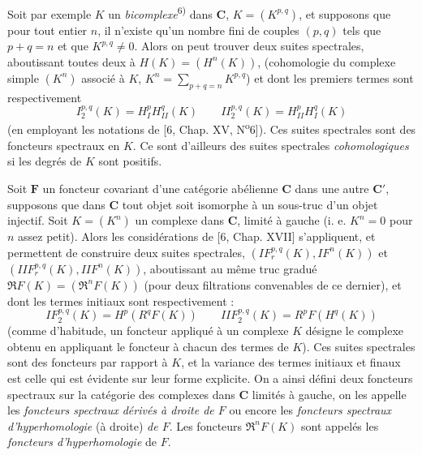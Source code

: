 
Soit par exemple $K$ un \textit{bicomplexe}\textsuperscript{6)} dans $\mathbf{C}$, $K=(K^{p,q})$, et
supposons que pour tout entier $n$, il n'existe qu'un nombre fini de couples
$(p,q)$ tels que $p+q=n$ et que $K^{p,q}\ne0$. Alors on peut trouver deux
suites spectrales, aboutissant toutes deux à $H(K)=(H^n(K))$, (cohomologie du
complexe simple $(K^n)$ associé à $K$,
$K^n=\displaystyle\sum_{p+q=n}K^{p,q}$) et dont les premiers termes sont respectivement
\[
\tag{2.4.1}
I_2^{p,q}(K)=H_{I}^pH_{II}^q(K)
\qquad
II_2^{p,q}(K)=H_{II}^pH_{I}^q(K)
\]
(en employant les notations de [6, Chap. XV, N\textsuperscript{o}6]). Ces
suites spectrales sont des foncteurs spectraux en $K$. Ce sont d'ailleurs des
suites spectrales \textit{cohomologiques} si les degrés de $K$ sont positifs.

Soit $\mathbf{F}$ un foncteur covariant d'une catégorie abélienne $\mathbf{C}$ dans une autre
$\mathbf{C}'$, supposons que dans $\mathbf{C}$ tout objet soit isomorphe à un sous-truc d'un
objet injectif. Soit $K=(K^n)$ un complexe dans $\mathbf{C}$, limité à gauche (i. e.
$K^n=0$ pour $n$ assez petit). Alors les considérations de [6, Chap. XVII]
s'appliquent, et permettent de construire deux suites spectrales,
$(IF_r^{p,q}(K),IF^n(K))$ et
$(IIF_r^{p,q}(K),IIF^n(K))$, aboutissant au même
truc gradué $\mathfrak R F(K)=(\mathfrak R^nF(K))$ (pour deux filtrations
convenables de ce dernier), et dont les termes initiaux sont respectivement :
\[
\tag{2.4.2}
IF_2^{p,q}(K)=H^p(R^qF(K))
\qquad
IIF_2^{p,q}(K)=R^pF(H^q(K))
\]
(comme d'habitude, un foncteur appliqué à un complexe $K$ désigne le complexe
obtenu en appliquant le foncteur à chacun des termes de $K$). Ces suites
spectrales sont des foncteurs par rapport à $K$, et la variance des termes
initiaux et finaux est celle qui est évidente sur leur forme explicite. On a
ainsi défini deux foncteurs spectraux sur la catégorie des complexes dans $\mathbf{C}$
limités à gauche, on les appelle les \textit{foncteurs spectraux dérivés à
droite de $F$} ou encore les \textit{foncteurs spectraux d'hyperhomologie} (à
droite) \textit{de $F$}. Les foncteurs $\mathfrak R^nF(K)$ sont appelés les
\textit{foncteurs d'hyperhomologie} de $F$.

